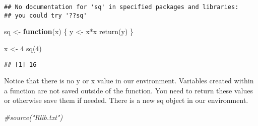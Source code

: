 \documentclass[
]{article}
\newenvironment{Shaded}{\begin{snugshade}}{\end{snugshade}}
\newcommand{\CommentTok}[1]{\textcolor[rgb]{0.56,0.35,0.01}{\textit{#1}}}
\newcommand{\ControlFlowTok}[1]{\textcolor[rgb]{0.13,0.29,0.53}{\textbf{#1}}}
\newcommand{\DecValTok}[1]{\textcolor[rgb]{0.00,0.00,0.81}{#1}}
\newcommand{\FunctionTok}[1]{\textcolor[rgb]{0.00,0.00,0.00}{#1}}
\newcommand{\NormalTok}[1]{#1}
\newcommand{\OtherTok}[1]{\textcolor[rgb]{0.56,0.35,0.01}{#1}}
\newcommand{\SpecialCharTok}[1]{\textcolor[rgb]{0.00,0.00,0.00}{#1}}
\begin{document}
\begin{verbatim}
## No documentation for 'sq' in specified packages and libraries:
## you could try '??sq'
\end{verbatim}

\begin{Shaded}
\begin{Highlighting}[]
\NormalTok{sq }\OtherTok{\textless{}{-}} \ControlFlowTok{function}\NormalTok{(x) \{}
\NormalTok{  y }\OtherTok{\textless{}{-}}\NormalTok{ x}\SpecialCharTok{*}\NormalTok{x}
  \FunctionTok{return}\NormalTok{(y)}
\NormalTok{\}}

\NormalTok{x }\OtherTok{\textless{}{-}} \DecValTok{4}
\FunctionTok{sq}\NormalTok{(}\DecValTok{4}\NormalTok{)}
\end{Highlighting}
\end{Shaded}

\begin{verbatim}
## [1] 16
\end{verbatim}

Notice that there is no y or x value in our environment. Variables
created within a function are not saved outside of the function. You
need to return these values or otherwise save them if needed. There is a
new sq object in our environment.

\begin{Shaded}
\begin{Highlighting}[]
\CommentTok{\#source("Rlib.txt")}
\end{Highlighting}
\end{Shaded}
\end{document}
